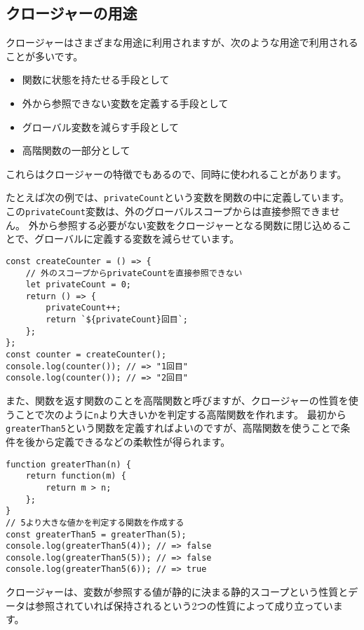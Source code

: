 \hypertarget{closure-usecase}{%
\subsection{クロージャーの用途}\label{closure-usecase}}

クロージャーはさまざまな用途に利用されますが、次のような用途で利用されることが多いです。

\begin{itemize}
\item
  関数に状態を持たせる手段として
\item
  外から参照できない変数を定義する手段として
\item
  グローバル変数を減らす手段として
\item
  高階関数の一部分として
\end{itemize}

これらはクロージャーの特徴でもあるので、同時に使われることがあります。

たとえば次の例では、\texttt{privateCount}という変数を関数の中に定義しています。
この\texttt{privateCount}変数は、外のグローバルスコープからは直接参照できません。
外から参照する必要がない変数をクロージャーとなる関数に閉じ込めることで、グローバルに定義する変数を減らせています。

\begin{lstlisting}
const createCounter = () => {
    // 外のスコープからprivateCountを直接参照できない
    let privateCount = 0;
    return () => {
        privateCount++;
        return `${privateCount}回目`;
    };
};
const counter = createCounter();
console.log(counter()); // => "1回目"
console.log(counter()); // => "2回目"
\end{lstlisting}

また、関数を返す関数のことを高階関数と呼びますが、クロージャーの性質を使うことで次のように\texttt{n}より大きいかを判定する高階関数を作れます。
最初から\texttt{greaterThan5}という関数を定義すればよいのですが、高階関数を使うことで条件を後から定義できるなどの柔軟性が得られます。

\begin{lstlisting}
function greaterThan(n) {
    return function(m) {
        return m > n; 
    };
}
// 5より大きな値かを判定する関数を作成する
const greaterThan5 = greaterThan(5);
console.log(greaterThan5(4)); // => false
console.log(greaterThan5(5)); // => false
console.log(greaterThan5(6)); // => true
\end{lstlisting}

クロージャーは、変数が参照する値が静的に決まる静的スコープという性質とデータは参照されていれば保持されるという2つの性質によって成り立っています。


